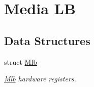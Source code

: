 \hypertarget{group__SAMV71__MLB}{}\section{Media LB}
\label{group__SAMV71__MLB}
\subsection*{Data Structures}
\begin{DoxyCompactItemize}
\item 
struct \mbox{\hyperlink{structMlb}{Mlb}}
\begin{DoxyCompactList}\small\item\em \mbox{\hyperlink{structMlb}{Mlb}} hardware registers. \end{DoxyCompactList}\end{DoxyCompactItemize}
